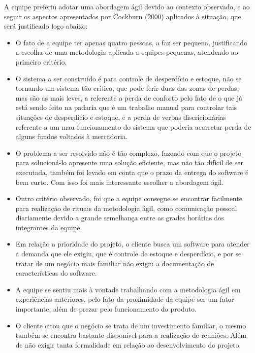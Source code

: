     A equipe preferiu adotar uma abordagem ágil devido ao contexto observado, e ao seguir os aspectos apresentados por Cockburn (2000) aplicados à situação, que será justificado logo abaixo:
\begin{itemize}
\item O fato de a equipe ter apenas quatro pessoas, a faz ser pequena, justificando a escolha de uma metodologia aplicada a equipes pequenas, atendendo ao primeiro critério.
\item O sistema a ser construído é para controle de desperdício e estoque, não se tornando um sistema tão crítico, que pode ferir duas das zonas de perdas, mas são as mais leves, a referente a perda de conforto pelo fato de o que já está sendo feito na padaria que é um trabalho manual para controlar tais situações de desperdício e estoque, e a perda de verbas discricionárias referente a um mau funcionamento do sistema que poderia acarretar perda de alguns fundos voltados à mercadoria.
\item O problema a ser resolvido não é tão complexo, fazendo com que o projeto para solucioná-lo apresente uma solução eficiente, mas não tão difícil de ser executada, também foi levado em conta que o prazo da entrega do software é bem curto. Com isso foi mais interessante escolher a abordagem ágil.
\item Outro critério observado, foi que a equipe consegue se encontrar facilmente para realização de rituais da metodologia ágil, como comunicação pessoal diariamente devido a grande semelhança entre as grades horárias dos integrantes da equipe.
\item Em relação a prioridade do projeto, o cliente busca um software para atender a demanda que ele exigiu, que é controle de estoque e desperdício, e por se tratar de um negócio mais familiar não exigiu a documentação de características do software.
\item A equipe se sentiu mais à vontade trabalhando com a metodologia ágil em experiências anteriores, pelo fato da proximidade da equipe ser um fator importante, além de prezar pelo funcionamento do produto.

\item O cliente citou que o negócio se trata de um investimento familiar, o mesmo também se encontra bastante disponível para a realização de reuniões. Além de não exigir tanta formalidade em relação ao desenvolvimento do projeto.
\end{itemize}